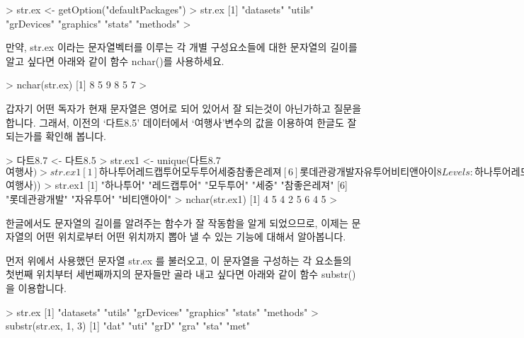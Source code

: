 \documentclass[tutorial.tex]{subfiles}
\begin{document}
\begin{Schunk}
\begin{Soutput}
> str.ex <- getOption("defaultPackages")
> str.ex
[1] "datasets"  "utils"     "grDevices" "graphics"  "stats"     "methods"  
>
\end{Soutput}
\end{Schunk}

만약, str.ex 이라는 문자열벡터를 이루는 각 개별 구성요소들에 대한 문자열의 길이를 알고 싶다면 아래와 같이 함수 nchar()를 사용하세요.

\begin{Schunk}
\begin{Soutput} 
> nchar(str.ex)
[1] 8 5 9 8 5 7
> 
\end{Soutput}
\end{Schunk}

갑자기 어떤 독자가 현재 문자열은 영어로 되어 있어서 잘 되는것이 아닌가하고 질문을 합니다. 
그래서, 이전의 `다트8.5' 데이터에서 `여행사'변수의 값을 이용하여 한글도 잘 되는가를 확인해 봅니다.

\begin{Schunk}
\begin{Soutput} 
> 다트8.7 <- 다트8.5
> str.ex1 <- unique(다트8.7$여행사)
> str.ex1
[1] 하나투어     레드캡투어   모두투어     세중         참좋은레져  
[6] 롯데관광개발 자유투어     비티앤아이  
8 Levels: 하나투어 레드캡투어 모두투어 세중 참좋은레져 ... 비티앤아이
>
> str.ex1 <- as.character(unique(다트8.7$여행사))
> str.ex1
[1] "하나투어"     "레드캡투어"   "모두투어"     "세중"         "참좋은레져"  
[6] "롯데관광개발" "자유투어"     "비티앤아이"  
> nchar(str.ex1)
[1] 4 5 4 2 5 6 4 5
>
\end{Soutput}
\end{Schunk}

한글에서도 문자열의 길이를 알려주는 함수가 잘 작동함을 알게 되었으므로, 이제는 문자열의 어떤 위치로부터 어떤 위치까지 뽑아 낼 수 있는 기능에 대해서 알아봅니다.

먼저 위에서 사용했던 문자열 str.ex 를 불러오고, 이 문자열을 구성하는 각 요소들의 첫번째 위치부터 세번째까지의 문자들만 골라 내고 싶다면 아래와 같이 함수 substr()을 이용합니다.

\begin{Schunk}
\begin{Soutput} 
> str.ex
[1] "datasets"  "utils"     "grDevices" "graphics"  "stats"     "methods"  
> substr(str.ex, 1, 3)
[1] "dat" "uti" "grD" "gra" "sta" "met"
\end{Soutput}
\end{Schunk}
\end{document}
